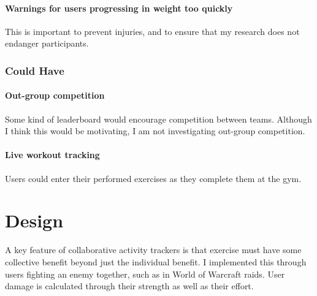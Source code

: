 \documentclass{l4proj}
\begin{document}
  \subsubsection{Warnings for users progressing in weight too quickly} 
  This is important to prevent injuries, and to ensure that my research does not endanger participants.

\subsection{Could Have}
  \subsubsection{Out-group competition}
  Some kind of leaderboard would encourage competition between teams. Although I think this would be motivating, I am not investigating out-group competition.

  \subsubsection{Live workout tracking}
  Users could enter their performed exercises as they complete them at the gym.




\chapter{Design}
A key feature of collaborative activity trackers is that exercise must have some collective benefit beyond just the individual benefit. I implemented this through users fighting an enemy together, such as in World of Warcraft raids. User damage is calculated through their strength as well as their effort. 
\end{document}
